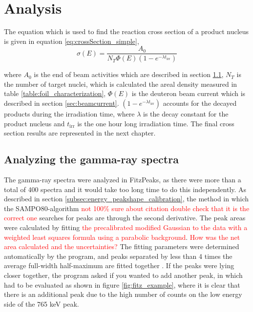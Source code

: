 \chapter{Analysis}\label{chapter:analysis} %

The equation which is used to find the reaction cross section of a product nucleus is given in equation \ref{eq:crossSection_simple},
$$\sigma(E)=\frac{A_0}{N_T \Phi(E)(1-e^{-\lambda t_\text{irr}})}$$

where $A_0$ is the end of beam activities which are described in section \ref{sec:EOB_A0},  $N_T$ is the number of target nuclei, which is calculated the areal density measured in table \ref{table:foil_characterization}, $\Phi(E)$ is the deuteron beam current which is described in section \ref{sec:beamcurrent}. $(1-e^{-\lambda t_\text{irr}})$ accounts for the decayed products during the irradiation time, where $\lambda$ is the decay constant for the product nucleus and $t_\text{irr}$ is the one hour long irradiation time.  The final cross section results are represented in the next chapter. 

\section{Analyzing the gamma-ray spectra} \label{sec:EOB_A0} 


\noindent 
The gamma-ray spectra were analyzed in FitzPeaks\cite{Fitzgerald2009}, as there were more than a total of 400 spectra and it would take too long time to do this independently. As described in section \ref{subsec:energy_peakshape_calibration}, the method in which the SAMPO80-algorithm \cite{Koskelo1981} \textcolor{red}{not 100\% sure about citation double check that it is the correct one} searches for peaks are through the second derivative. The peak areas were calculated by fitting \textcolor{red}{the precalibrated modified Gaussian to the data with a weighted least squares formula using a parabolic background}. \textcolor{red}{How was the net area calculated and the uncertainties?} The fitting parameters were determined automatically by the program, and peaks separated by less than 4 times the average full-width half-maximum are fitted together \cite{Koskelo1981}. If the peaks were lying closer together, the program asked if you wanted to add another peak, in which had to be evaluated as shown in figure \ref{fig:fitz_example}, where it is clear that there is an additional peak due to the high number of counts on the low energy side of the 765 keV peak. 

